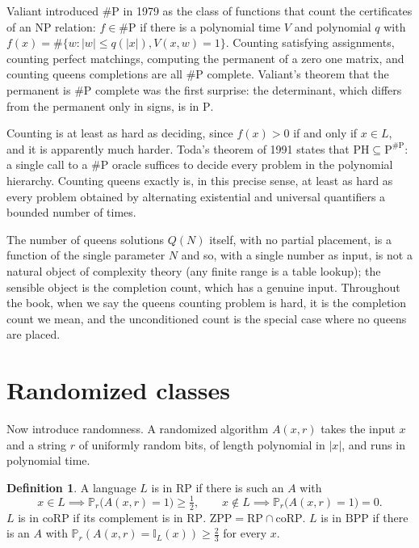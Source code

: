 \documentclass[11pt,twoside,openany]{book}
\theoremstyle{plain}
\theoremstyle{definition}
\newtheorem{definition}[theorem]{Definition}
\theoremstyle{remark}
\newcommand{\PP}{\mathbb{P}}
\newcommand{\Ind}{\mathbb{I}}
\newcommand{\RP}{\mathrm{RP}}
\newcommand{\coRP}{\mathrm{coRP}}
\newcommand{\BPP}{\mathrm{BPP}}
\newcommand{\ZPP}{\mathrm{ZPP}}
\newcommand{\NP}{\mathrm{NP}}
\newcommand{\Pc}{\mathrm{P}}
\newcommand{\sharpP}{\#\mathrm{P}}
\newcommand{\PH}{\mathrm{PH}}
\begin{document}
Valiant introduced $\sharpP$ in 1979 as the class of functions that count the certificates of an $\NP$ relation: $f \in \sharpP$ if there is a polynomial time $V$ and polynomial $q$ with $f(x) = \#\{ w : |w| \le q(|x|), V(x, w) = 1 \}$. Counting satisfying assignments, counting perfect matchings, computing the permanent of a zero one matrix, and counting queens completions are all $\sharpP$ complete. Valiant's theorem that the permanent is $\sharpP$ complete was the first surprise: the determinant, which differs from the permanent only in signs, is in $\Pc$.

Counting is at least as hard as deciding, since $f(x) > 0$ if and only if $x \in L$, and it is apparently much harder. Toda's theorem of 1991 states that $\PH \subseteq \Pc^{\sharpP}$: a single call to a $\sharpP$ oracle suffices to decide every problem in the polynomial hierarchy. Counting queens exactly is, in this precise sense, at least as hard as every problem obtained by alternating existential and universal quantifiers a bounded number of times.

The number of queens solutions $Q(N)$ itself, with no partial placement, is a function of the single parameter $N$ and so, with a single number as input, is not a natural object of complexity theory (any finite range is a table lookup); the sensible object is the completion count, which has a genuine input. Throughout the book, when we say the queens counting problem is hard, it is the completion count we mean, and the unconditioned count is the special case where no queens are placed.

\section{Randomized classes}

Now introduce randomness. A randomized algorithm $A(x, r)$ takes the input $x$ and a string $r$ of uniformly random bits, of length polynomial in $|x|$, and runs in polynomial time.

\begin{definition}
A language $L$ is in $\RP$ if there is such an $A$ with
\[
x \in L \implies \PP_r\big( A(x, r) = 1 \big) \ge \tfrac12, \qquad
x \notin L \implies \PP_r\big( A(x, r) = 1 \big) = 0 .
\]
$L$ is in $\coRP$ if its complement is in $\RP$. $\ZPP = \RP \cap \coRP$. $L$ is in $\BPP$ if there is an $A$ with $\PP_r(A(x,r) = \Ind_L(x)) \ge \tfrac23$ for every $x$.
\end{definition}
\end{document}
